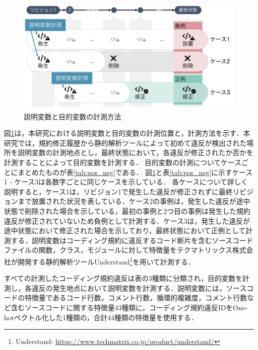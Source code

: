 \documentclass[11pt,dvipdfmx]{jreport}
\begin{document}
\begin{figure}[t]
	\centering
	\includegraphics[width=1.0\linewidth]{Kameoka_fig/kameoka_fig2.pdf}
	\caption{説明変数と目的変数の計測方法}
	\label{fig:mokutekihensu}
\end{figure}

図\ref{fig:mokutekihensu}は，本研究における説明変数と目的変数の計測位置と，計測方法を示す．本研究では，規約修正履歴から静的解析ツールによって初めて違反が検出された場所を説明変数の計測地点とし，最終状態において，各違反が修正されたか否かを計測することによって目的変数を計測する．
目的変数の計測についてケースごとにまとめたものが表\ref{tab:pos_neg}である．
図\ref{fig:mokutekihensu}と表\ref{tab:pos_neg}に示すケース1 - ケース3は各数字ごとに同じケースを示している．
各ケースについて詳しく説明すると，ケース1は，リビジョン1で発生した違反が修正されずに最終リビジョンまで放置された状況を表している．ケース2の事例は，発生した違反が途中状態で削除された場合を示している，最初の事例と2つ目の事例は発生した規約違反が修正されていないため負例として計測する．ケース3は，発生した違反が途中状態において修正された場合を示しており，最終状態において正例として計測する．説明変数はコーディング規約に違反するコード断片を含むソースコードファイルの関数，クラス，モジュールに対して特徴量をテクマトリックス株式会社が開発する静的解析ツールUnderstand\footnote{Understand: \url{https://www.techmatrix.co.jp/product/understand/}}を用いて計測する．

すべての計測したコーディング規約違反は表の3種類に分類され，目的変数を計測し，各違反の発生地点において説明変数を計測する．説明変数には，ソースコードの特徴量であるコード行数，コメント行数，循環的複雑度，コメント行数など含むソースコードに関する特徴量43種類に，コーディング規約違反IDをOne-hotベクトル化した1種類の，合計44種類の特徴量を使用する．


\end{document}

